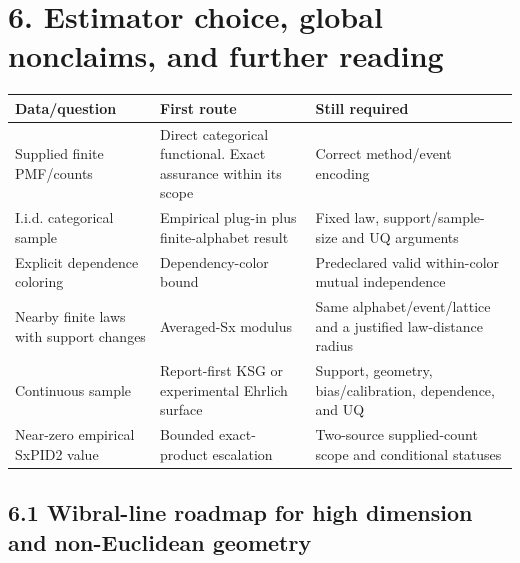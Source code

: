 \documentclass[
  11pt,
  a4paper,
]{article}
\newcounter{none} %
\begin{document}
\clearpage

\section{6. Estimator choice, global nonclaims, and further
reading}\label{6-estimator-choice-global-nonclaims-and-further-reading}

{\def\LTcaptype{none} %
\begin{longtable}[]{@{}
  >{\raggedright\arraybackslash}p{}
  >{\raggedright\arraybackslash}p{}
  >{\raggedright\arraybackslash}p{}@{}}
\toprule\noalign{}
\begin{minipage}[b]{\linewidth}\raggedright
Data/question
\end{minipage} & \begin{minipage}[b]{\linewidth}\raggedright
First route
\end{minipage} & \begin{minipage}[b]{\linewidth}\raggedright
Still required
\end{minipage} \\
\midrule\noalign{}
\endhead
\bottomrule\noalign{}
\endlastfoot
Supplied finite PMF/counts & Direct categorical functional. Exact
assurance within its scope & Correct method/event encoding \\
I.i.d. categorical sample & Empirical plug-in plus finite-alphabet
result & Fixed law, support/sample-size and UQ arguments \\
Explicit dependence coloring & Dependency-color bound & Predeclared
valid within-color mutual independence \\
Nearby finite laws with support changes & Averaged-Sx modulus & Same
alphabet/event/lattice and a justified law-distance radius \\
Continuous sample & Report-first KSG or experimental Ehrlich surface &
Support, geometry, bias/calibration, dependence, and UQ \\
Near-zero empirical SxPID2 value & Bounded exact-product escalation &
Two-source supplied-count scope and conditional statuses \\
\end{longtable}
}


\subsection{6.1 Wibral-line roadmap for high dimension and non-Euclidean
geometry}\label{61-wibral-line-roadmap-for-high-dimension-and-non-euclidean-geometry}
\end{document}
